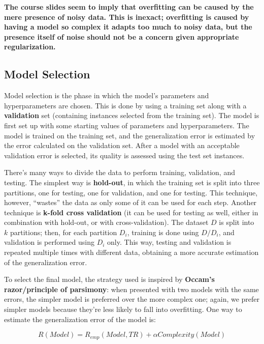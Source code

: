 \textbf{The course slides seem to imply that overfitting can be caused by the mere presence of noisy data. This is inexact; overfitting is caused by having a model so complex it adapts too much to noisy data, but the presence itself of noise should not be a concern given appropriate regularization.}

\subsection{Model Selection}

Model selection is the phase in which the model's parameters and hyperparameters are chosen. This is done by using a training set along with a \textbf{validation} set (containing instances selected from the training set). The model is first set up with some starting values of parameters and hyperparameters. The model is trained on the training set, and the generalization error is estimated by the error calculated on the validation set. After a model with an acceptable validation error is selected, its quality is assessed using the test set instances.

There's many ways to divide the data to perform training, validation, and testing. The simplest way is \textbf{hold-out}, in which the training set is split into three partitions, one for testing, one for validation, and one for testing. This technique, however, ``wastes'' the data as only some of it can be used for each step. Another technique is \textbf{k-fold cross validation} (it can be used for testing as well, either in combination with hold-out, or with cross-validation). The dataset $D$ is split into $k$ partitions; then, for each partition $D_i$, training is done using $D / D_i$, and validation is performed using $D_i$ only. This way, testing and validation is repeated multiple times with different data, obtaining a more accurate estimation of the generalization error.

To select the final model, the strategy used is inspired by \textbf{Occam's razor/principle of parsimony}: when presented with two models with the same errors, the simpler model is preferred over the more complex one; again, we prefer simpler models because they're less likely to fall into overfitting. One way to estimate the generalization error of the model is:

\begin{equation*}
    R(Model) = R_{emp}(Model, TR) + \alpha Complexity(Model)
\end{equation*}

